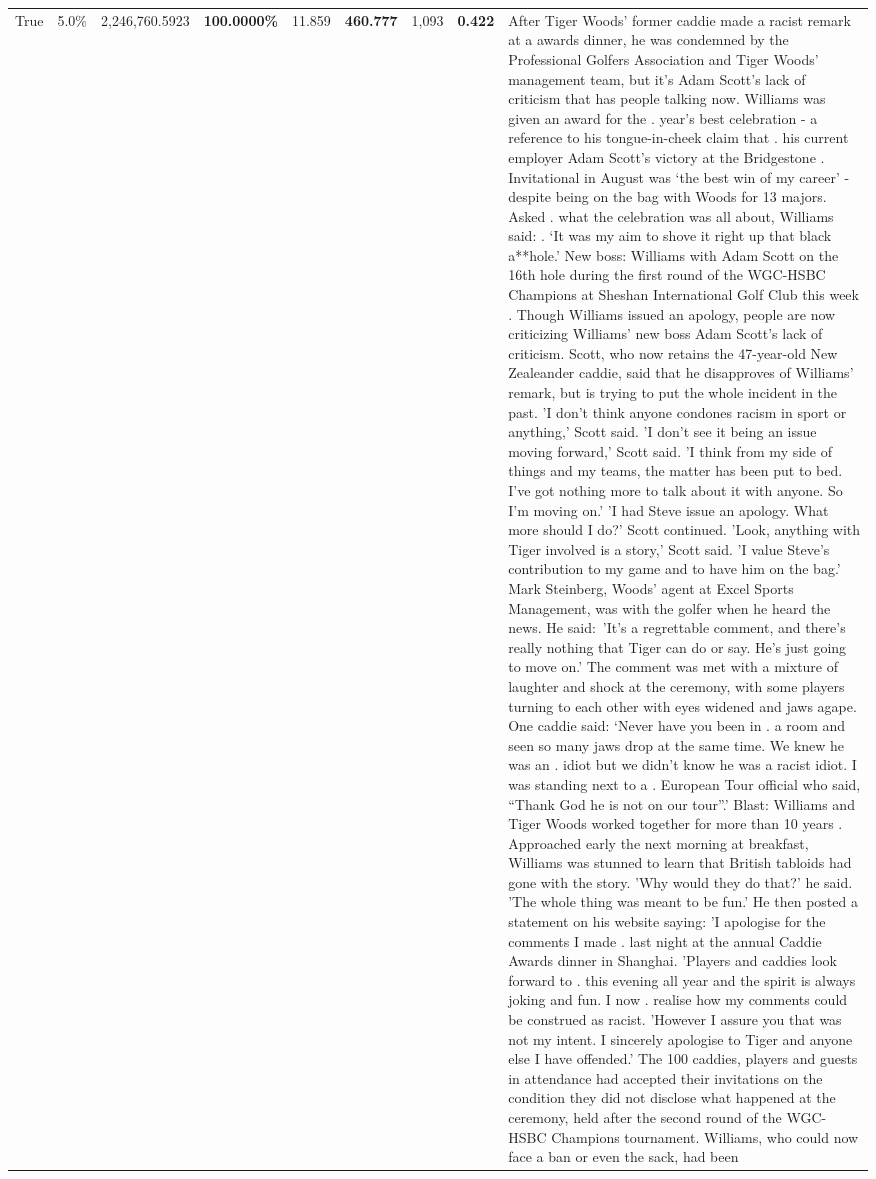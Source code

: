 \begin{table}[H]
\begin{tabular}{lllrlllll}
True & 5.0\% & 2,246,760.5923 & \bfseries \color{red} 100.0000\% & 11.859 & \bfseries \color{red} 460.777 & 1,093 & \bfseries \color{red} 0.422 & After Tiger Woods' former caddie made a racist remark at a awards dinner, he was condemned by the Professional Golfers Association and Tiger Woods' management team, but it's Adam Scott's lack of criticism that has people talking now. Williams was given an award for the . year’s best celebration - a reference to his tongue-in-cheek claim that . his current employer Adam Scott’s victory at the Bridgestone . Invitational in August was ‘the best win of my career’ - despite being on the bag with Woods for 13 majors. Asked . what the celebration was all about, Williams said: . ‘It was my aim to shove it right up that black a**hole.’ New boss: Williams with Adam Scott  on the 16th hole during the first round of the WGC-HSBC Champions at Sheshan International Golf Club this week . Though Williams issued an apology, people are now criticizing Williams' new boss Adam Scott's lack of criticism. Scott, who now retains the 47-year-old New Zealeander caddie, said that he disapproves of Williams' remark, but is trying to put the whole incident in the past. 'I don't think anyone condones racism in sport or anything,' Scott said. 'I don't see it being an issue moving forward,' Scott said. 'I think from my side of things and my teams, the matter has been put to bed. I've got nothing more to talk about it with anyone. So I'm moving on.' 'I had Steve issue an apology. What more should I do?' Scott continued. 'Look, anything with Tiger involved is a story,' Scott said. 'I value Steve's contribution to my game and to have him on the bag.' Mark Steinberg, Woods' agent at Excel Sports Management, was with the golfer when he heard the news. He said: 'It's a regrettable comment, and there's really nothing that Tiger can do or say. He's just going to move on.' The comment was met with a mixture of laughter and shock at the ceremony, with some players turning to each other with eyes widened and jaws agape. One caddie said: ‘Never have you been in . a room and seen so many jaws drop at the same time. We knew he was an . idiot but we didn’t know he was a racist idiot. I was standing next to a . European Tour official who said, “Thank God he is not on our tour”.’ Blast: Williams and Tiger Woods worked together for more than 10 years . Approached early the next morning at breakfast, Williams was stunned to learn that British tabloids had gone with the story. 'Why would they do that?' he said. 'The whole thing was meant to be fun.' He then posted a statement on his website saying: 'I apologise for the comments I made . last night at the annual Caddie Awards dinner in Shanghai. 'Players and caddies look forward to . this evening all year and the spirit is always joking and fun. I now . realise how my comments could be construed as racist. 'However I assure you that was not my intent. I sincerely apologise to Tiger and anyone else I have offended.' The 100 caddies, players and guests in attendance had accepted their invitations on the condition they did not disclose what happened at the ceremony, held after the second round of the WGC-HSBC Champions tournament. Williams, who could now face a ban or even the sack, had been 
\end{tabular}
\end{table}
